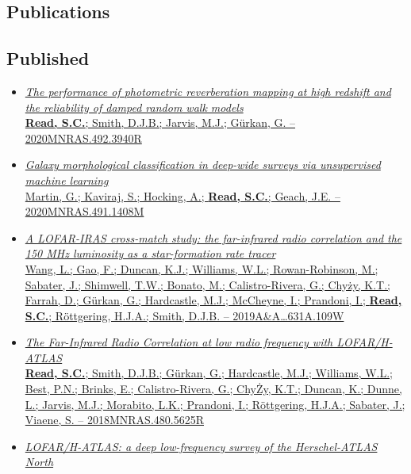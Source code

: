 \documentclass[letterpaper]{twentysecondcv} %
\begin{document}
\begin{finalpages}
\section{Publications}
\subsection{Published}
\begin{itemize}
     \item \href{http://shaun.science/publication/2020-03-00-The-performance-of-photometric-reverberation-mapping-at-high-redshift-and-the-reliability-of-damped-random-walk-models}{\textit{The performance of photometric reverberation mapping at high redshift
and the reliability of damped random walk models}\\{\small \textbf{Read, S.C.}; Smith, D.J.B.; Jarvis, M.J.; Gürkan, G. -- 2020MNRAS.492.3940R}}
 \item \href{http://shaun.science/publication/2020-01-00-Galaxy-morphological-classification-in-deep-wide-surveys-via-unsupervised-machine-learning}{\textit{Galaxy morphological classification in deep-wide surveys via
unsupervised machine learning}\\{\small Martin, G.; Kaviraj, S.; Hocking, A.; \textbf{Read, S.C.}; Geach, J.E. -- 2020MNRAS.491.1408M}}
 \item \href{http://shaun.science/publication/2019-11-00-A-LOFAR-IRAS-cross-match-study}{\textit{A LOFAR-IRAS cross-match study: the far-infrared radio correlation and
the 150 MHz luminosity as a star-formation rate tracer}\\{\small Wang, L.; Gao, F.; Duncan, K.J.; Williams, W.L.; Rowan-Robinson, M.;
Sabater, J.; Shimwell, T.W.; Bonato, M.; Calistro-Rivera, G.; Chyży,
K.T.; Farrah, D.; Gürkan, G.; Hardcastle, M.J.; McCheyne, I.; Prandoni,
I.; \textbf{Read, S.C.}; Röttgering, H.J.A.; Smith, D.J.B. -- 2019A\&A\ldots631A.109W}}
 \item \href{http://shaun.science/publication/2018-11-00-The-Far-Infrared-Radio-Correlation-at-low-radio-frequency-with-LOFAR-H-ATLAS}{\textit{The Far-Infrared Radio Correlation at low radio frequency with
LOFAR/H-ATLAS}\\{\small \textbf{Read, S.C.}; Smith, D.J.B.; Gürkan, G.; Hardcastle, M.J.;
Williams, W.L.; Best, P.N.; Brinks, E.; Calistro-Rivera, G.; ChyŻy,
K.T.; Duncan, K.; Dunne, L.; Jarvis, M.J.; Morabito, L.K.; Prandoni, I.;
Röttgering, H.J.A.; Sabater, J.; Viaene, S. -- 2018MNRAS.480.5625R}}
 \item \href{http://shaun.science/publication/2016-10-00-LOFAR-H-ATLAS}{\textit{LOFAR/H-ATLAS: a deep low-frequency survey of the Herschel-ATLAS North
}}
\end{itemize}
\end{finalpages}
\end{document}
